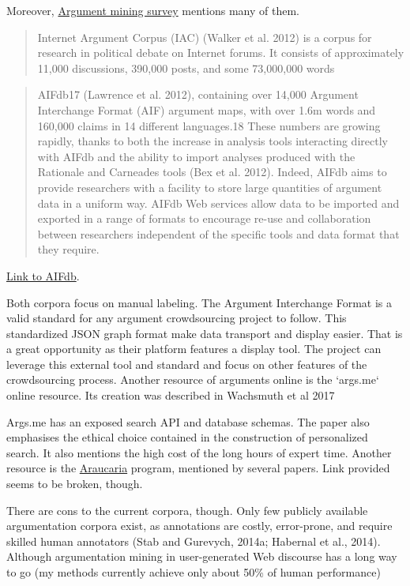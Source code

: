 \documentclass{report}
\begin{document}
Moreover, \href{https://direct.mit.edu/coli/article/45/4/765/93362/Argument-Mining-A-Survey}{Argument mining survey} mentions many of them.
\begin{quote}
 Internet Argument Corpus (IAC) (Walker et al. 2012) is a corpus for research in political debate on Internet forums. It consists of approximately 11,000 discussions, 390,000 posts, and some 73,000,000 words
\end{quote}
\begin{quote}
 AIFdb17 (Lawrence et al. 2012), containing over 14,000 Argument Interchange Format (AIF) argument maps, with over 1.6m words and 160,000 claims in 14 different languages.18 These numbers are growing rapidly, thanks to both the increase in analysis tools interacting directly with AIFdb and the ability to import analyses produced with the Rationale and Carneades tools (Bex et al. 2012). Indeed, AIFdb aims to provide researchers with a facility to store large quantities of argument data in a uniform way. AIFdb Web services allow data to be imported and exported in a range of formats to encourage re-use and collaboration between researchers independent of the specific tools and data format that they require.
\end{quote}
\href{https://corpora.aifdb.org/}{Link to AIFdb}.

Both corpora focus on manual labeling.
The Argument Interchange Format is a valid standard for any argument crowdsourcing project to follow.  This standardized JSON graph format make data transport and display easier. That is a great opportunity as their platform features a display tool.  The project can leverage this external tool and standard and focus on other features of the crowdsourcing process.
Another resource of arguments online is the `args.me` online resource. 
Its creation was described in Wachsmuth et al 2017

Args.me has an exposed search API and database schemas. The paper also emphasises the ethical choice contained in the construction of personalized search.
It also mentions the high cost of the long hours of expert time.
Another resource is the \href{http://araucaria.computing.dundee.ac.uk/}{Araucaria} program, mentioned by several papers. Link provided seems to be broken, though. 

There are cons to the current corpora, though.
Only few publicly available argumentation corpora exist, as annotations are costly, error-prone, and require skilled human annotators (Stab and Gurevych, 2014a; Habernal et al., 2014).
Although argumentation mining in user-generated Web discourse has a long way to go (my  methods currently achieve only about 50\% of human performance)
\end{document}

